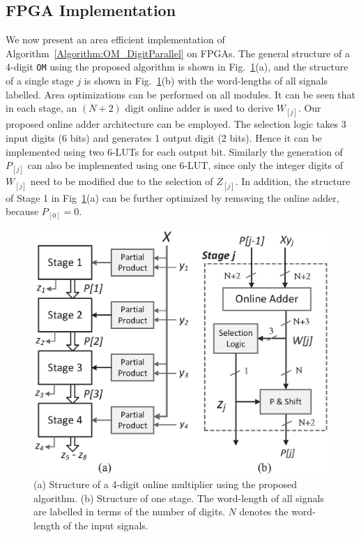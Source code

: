 \documentclass[conference]{IEEEtran}
\begin{document}
\subsection{FPGA Implementation}\vspace{-0.5ex}
We now present an area efficient implementation of Algorithm~\ref{Algorithm:OM_DigitParallel} on FPGAs. The general structure of a 4-digit \texttt{OM} using the proposed algorithm is shown in Fig.~\ref{Fig:PMStructure}(a), and the structure of a single stage $j$ is shown in Fig.~\ref{Fig:PMStructure}(b) with the word-lengths of all signals labelled. Area optimizations can be performed on all modules. It can be seen that in each stage, an $(N+2)$ digit online adder is used to derive $W_{[j]}$. Our proposed online adder architecture can be employed. The selection logic takes 3 input digits (6 bits) and generates 1 output digit (2 bits). Hence it can be implemented using two 6-LUTs for each output bit. Similarly the generation of $P_{[j]}$ can also be implemented using one 6-LUT, since only the integer digits of $W_{[j]}$ need to be modified due to the selection of $Z_{[j]}$. In addition, the structure of Stage 1 in Fig~\ref{Fig:PMStructure}(a) can be further optimized by removing the online adder, because $P_{[0]}=0$.\vspace{-0.5ex}
%
\begin{figure}[tbp]
	\centering
	\includegraphics[width=.5\textwidth]{./Figures/ParallelMult_Structure.eps}
	\vspace{-3ex}
	\caption{(a) Structure of a 4-digit online multiplier using the proposed algorithm. (b) Structure of one stage. The word-length of all signals are labelled in terms of the number of digits. $N$ denotes the word-length of the input signals.}
	\label{Fig:PMStructure}
	\vspace{-2ex}
\end{figure}
\end{document}
